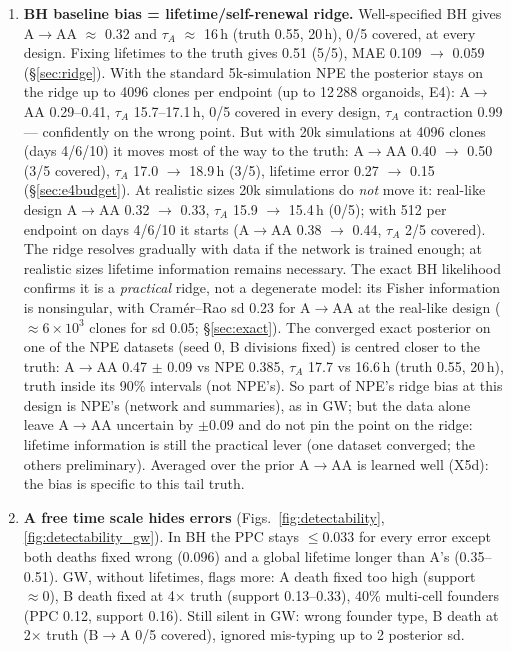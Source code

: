 \documentclass[10pt,a4paper]{article}
\newcommand{\tA}{$\tau_A$}
\begin{document}
\begin{enumerate}[leftmargin=1.4em]
\item \textbf{BH baseline bias = lifetime/self-renewal ridge.} Well-specified BH gives A$\to$AA $\approx$ 0.32 and \tA{} $\approx$ 16\,h (truth 0.55, 20\,h), 0/5 covered, at every design. Fixing lifetimes to the truth gives 0.51 (5/5), MAE 0.109 $\to$ 0.059 (\S\ref{sec:ridge}). With the standard 5k-simulation NPE the posterior stays on the ridge up to 4096 clones per endpoint (up to 12\,288 organoids, E4): A$\to$AA 0.29--0.41, \tA{} 15.7--17.1\,h, 0/5 covered in every design, \tA{} contraction 0.99 --- confidently on the wrong point. But with 20k simulations at 4096 clones (days 4/6/10) it moves most of the way to the truth: A$\to$AA 0.40 $\to$ 0.50 (3/5 covered), \tA{} 17.0 $\to$ 18.9\,h (3/5), lifetime error 0.27 $\to$ 0.15 (\S\ref{sec:e4budget}). At realistic sizes 20k simulations do \emph{not} move it: real-like design A$\to$AA 0.32 $\to$ 0.33, \tA{} 15.9 $\to$ 15.4\,h (0/5); with 512 per endpoint on days 4/6/10 it starts (A$\to$AA 0.38 $\to$ 0.44, \tA{} 2/5 covered). The ridge resolves gradually with data if the network is trained enough; at realistic sizes lifetime information remains necessary. The exact BH likelihood confirms it is a \emph{practical} ridge, not a degenerate model: its Fisher information is nonsingular, with Cram\'er--Rao sd 0.23 for A$\to$AA at the real-like design ($\approx 6\times10^3$ clones for sd 0.05; \S\ref{sec:exact}). The converged exact posterior on one of the NPE datasets (seed 0, B divisions fixed) is centred closer to the truth: A$\to$AA 0.47 $\pm$ 0.09 vs NPE 0.385, \tA{} 17.7 vs 16.6\,h (truth 0.55, 20\,h), truth inside its 90\% intervals (not NPE's). So part of NPE's ridge bias at this design is NPE's (network and summaries), as in GW; but the data alone leave A$\to$AA uncertain by $\pm 0.09$ and do not pin the point on the ridge: lifetime information is still the practical lever (one dataset converged; the others preliminary). Averaged over the prior A$\to$AA is learned well (X5d): the bias is specific to this tail truth.
\item \textbf{A free time scale hides errors} (Figs.~\ref{fig:detectability}, \ref{fig:detectability_gw}). In BH the PPC stays $\le 0.033$ for every error except both deaths fixed wrong (0.096) and a global lifetime longer than A's (0.35--0.51). GW, without lifetimes, flags more: A death fixed too high (support $\approx 0$), B death fixed at 4$\times$ truth (support 0.13--0.33), 40\% multi-cell founders (PPC 0.12, support 0.16). Still silent in GW: wrong founder type, B death at 2$\times$ truth (B$\to$A 0/5 covered), ignored mis-typing up to 2 posterior sd.

\end{enumerate}
\end{document}
